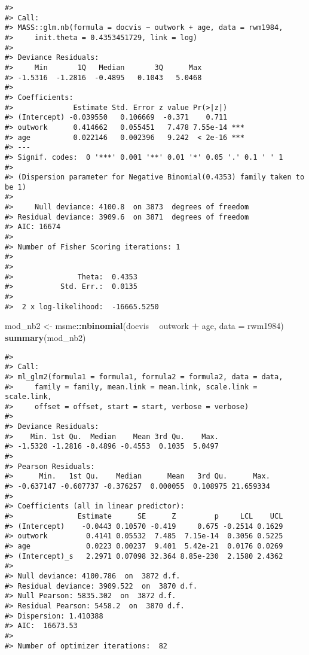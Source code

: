 \documentclass[ngerman,a4paper,]{scrartcl}
\newenvironment{Shaded}{\begin{snugshade}}{\end{snugshade}}
\newcommand{\DataTypeTok}[1]{\textcolor[rgb]{0.13,0.29,0.53}{#1}}
\newcommand{\KeywordTok}[1]{\textcolor[rgb]{0.13,0.29,0.53}{\textbf{#1}}}
\newcommand{\NormalTok}[1]{#1}
\newcommand{\OperatorTok}[1]{\textcolor[rgb]{0.81,0.36,0.00}{\textbf{#1}}}
\newcommand{\StringTok}[1]{\textcolor[rgb]{0.31,0.60,0.02}{#1}}
\theoremstyle{definition}
\theoremstyle{definition}
\theoremstyle{definition}
\theoremstyle{remark}
\begin{document}
\begin{verbatim}
#> 
#> Call:
#> MASS::glm.nb(formula = docvis ~ outwork + age, data = rwm1984, 
#>     init.theta = 0.4353451729, link = log)
#> 
#> Deviance Residuals: 
#>     Min       1Q   Median       3Q      Max  
#> -1.5316  -1.2816  -0.4895   0.1043   5.0468  
#> 
#> Coefficients:
#>              Estimate Std. Error z value Pr(>|z|)    
#> (Intercept) -0.039550   0.106669  -0.371    0.711    
#> outwork      0.414662   0.055451   7.478 7.55e-14 ***
#> age          0.022146   0.002396   9.242  < 2e-16 ***
#> ---
#> Signif. codes:  0 '***' 0.001 '**' 0.01 '*' 0.05 '.' 0.1 ' ' 1
#> 
#> (Dispersion parameter for Negative Binomial(0.4353) family taken to be 1)
#> 
#>     Null deviance: 4100.8  on 3873  degrees of freedom
#> Residual deviance: 3909.6  on 3871  degrees of freedom
#> AIC: 16674
#> 
#> Number of Fisher Scoring iterations: 1
#> 
#> 
#>               Theta:  0.4353 
#>           Std. Err.:  0.0135 
#> 
#>  2 x log-likelihood:  -16665.5250
\end{verbatim}

\begin{Shaded}
\begin{Highlighting}[]
\NormalTok{mod_nb2 <-}\StringTok{ }\NormalTok{msme}\OperatorTok{::}\KeywordTok{nbinomial}\NormalTok{(docvis }\OperatorTok{~}\StringTok{ }\NormalTok{outwork }\OperatorTok{+}\StringTok{ }\NormalTok{age,}
                           \DataTypeTok{data =}\NormalTok{ rwm1984)}
\KeywordTok{summary}\NormalTok{(mod_nb2)}
\end{Highlighting}
\end{Shaded}

\begin{verbatim}
#> 
#> Call:
#> ml_glm2(formula1 = formula1, formula2 = formula2, data = data, 
#>     family = family, mean.link = mean.link, scale.link = scale.link, 
#>     offset = offset, start = start, verbose = verbose)
#> 
#> Deviance Residuals:
#>    Min. 1st Qu.  Median    Mean 3rd Qu.    Max. 
#> -1.5320 -1.2816 -0.4896 -0.4553  0.1035  5.0497 
#> 
#> Pearson Residuals:
#>      Min.   1st Qu.    Median      Mean   3rd Qu.      Max. 
#> -0.637147 -0.607737 -0.376257  0.000055  0.108975 21.659334 
#> 
#> Coefficients (all in linear predictor):
#>               Estimate      SE      Z         p     LCL    UCL
#> (Intercept)    -0.0443 0.10570 -0.419     0.675 -0.2514 0.1629
#> outwork         0.4141 0.05532  7.485  7.15e-14  0.3056 0.5225
#> age             0.0223 0.00237  9.401  5.42e-21  0.0176 0.0269
#> (Intercept)_s   2.2971 0.07098 32.364 8.85e-230  2.1580 2.4362
#> 
#> Null deviance: 4100.786  on  3872 d.f.
#> Residual deviance: 3909.522  on  3870 d.f.
#> Null Pearson: 5835.302  on  3872 d.f.
#> Residual Pearson: 5458.2  on  3870 d.f.
#> Dispersion: 1.410388
#> AIC:  16673.53
#> 
#> Number of optimizer iterations:  82
\end{verbatim}
\end{document}
